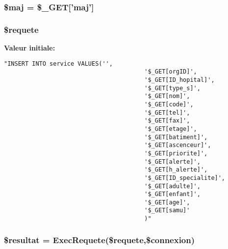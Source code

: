 \hypertarget{service__enregistre_8php_a1}{
\subsubsection[\$maj]{\setlength{\rightskip}{0pt plus 5cm}\$maj = \$\_\-GET\mbox{[}'maj'\mbox{]}}}
\label{service__enregistre_8php_a1}


\hypertarget{service__enregistre_8php_a3}{
\subsubsection[\$requete]{\setlength{\rightskip}{0pt plus 5cm}\$requete}}
\label{service__enregistre_8php_a3}


{\bf Valeur initiale:}

\footnotesize\begin{verbatim}"INSERT INTO service VALUES('',
                                        '$_GET[orgID]',
                                        '$_GET[ID_hopital]',
                                        '$_GET[type_s]',
                                        '$_GET[nom]',
                                        '$_GET[code]',
                                        '$_GET[tel]',
                                        '$_GET[fax]',
                                        '$_GET[etage]',
                                        '$_GET[batiment]',
                                        '$_GET[ascenceur]',
                                        '$_GET[priorite]',
                                        '$_GET[alerte]',
                                        '$_GET[h_alerte]',
                                        '$_GET[ID_specialite]',
                                        '$_GET[adulte]',
                                        '$_GET[enfant]',
                                        '$_GET[age]',
                                        '$_GET[samu]'
                                        )"
\end{verbatim}\normalsize 
\hypertarget{service__enregistre_8php_a4}{
\subsubsection[\$resultat]{\setlength{\rightskip}{0pt plus 5cm}\$resultat = Exec\-Requete(\$requete,\$connexion)}}
\label{service__enregistre_8php_a4}


